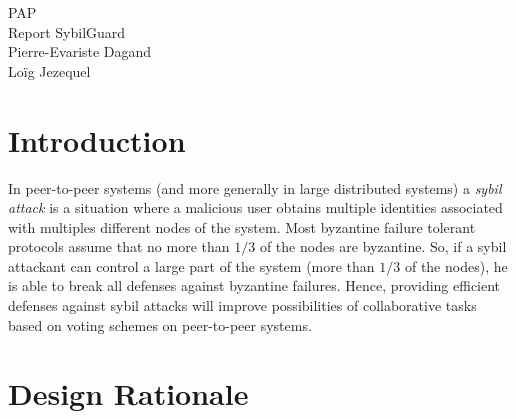 \documentclass[a4paper,11pt]{article}
\begin{document}
\begin{center} 
  {\Large PAP \\ Report SybilGuard}\\
  Pierre-Evariste {\sc Dagand} \\
  Loïg {\sc Jezequel}
\end{center}

\section*{Introduction}


In peer-to-peer systems (and more generally in large distributed systems) a \emph{sybil attack} is a situation where a malicious user obtains multiple identities associated with multiples different nodes of the system.
Most byzantine failure tolerant protocols assume that no more than $1/3$ of the nodes are byzantine.
So, if a sybil attackant can control a large part of the system (more than $1/3$ of the nodes), he is able to break all defenses against byzantine failures.
Hence, providing efficient defenses against sybil attacks will improve possibilities of collaborative tasks based on voting schemes on peer-to-peer systems.




\section{Design Rationale}

\end{document}
